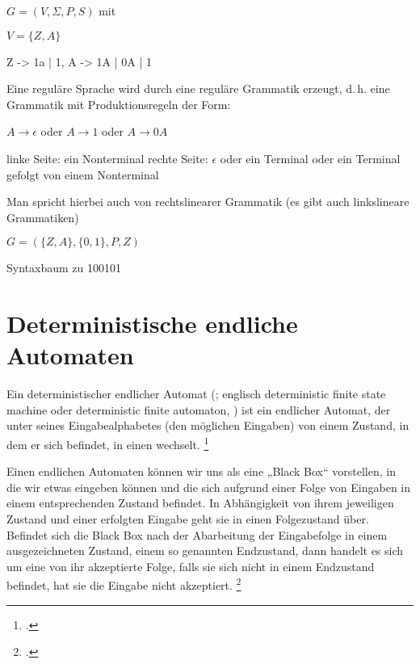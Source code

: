 \documentclass{lehramt-informatik-haupt}
\begin{document}
$G = (V, \Sigma, P, S)$ mit

$V = \{Z, A\}$


\begin{liProduktionsRegeln}
Z -> 1a | 1,
A -> 1A | 0A | 1
\end{liProduktionsRegeln}

Eine reguläre Sprache wird durch eine reguläre Grammatik erzeugt, d.\,h.
eine Grammatik mit Produktionsregeln der Form:

$A \rightarrow \epsilon$ oder $A \rightarrow 1$ oder $A \rightarrow 0A$

linke Seite: ein Nonterminal rechte Seite: $\epsilon$ oder ein Terminal
oder ein Terminal gefolgt von einem Nonterminal

Man spricht hierbei auch von rechtslinearer Grammatik (es gibt auch
linkslineare Grammatiken)

$G = (\{Z, A\}, \{0, 1\}, P, Z)$

Syntaxbaum zu 100101
\begin{center}
\end{center}

%

\section{Deterministische endliche Automaten}

Ein deterministischer endlicher Automat (; englisch
deterministic finite state machine oder deterministic finite automaton,
) ist ein endlicher Automat, der unter  seines Eingabealphabetes (den möglichen Eingaben) von einem
Zustand, in dem er sich befindet, in einen  wechselt.
\footcite{wiki:dea}

Einen endlichen Automaten können wir uns als eine „Black Box“
vorstellen, in die wir etwas eingeben können und die sich aufgrund einer
Folge von Eingaben in einem entsprechenden Zustand befindet. In
Abhängigkeit von ihrem jeweiligen Zustand und einer erfolgten Eingabe
geht sie in einen Folgezustand über. Befindet sich die Black Box nach
der Abarbeitung der Eingabefolge in einem ausgezeichneten Zustand, einem
so genannten Endzustand, dann handelt es sich um eine von ihr
akzeptierte Folge, falls sie sich nicht in einem Endzustand befindet,
hat sie die Eingabe nicht akzeptiert.
\footcite[Seite 11]{vossen}
\end{document}

